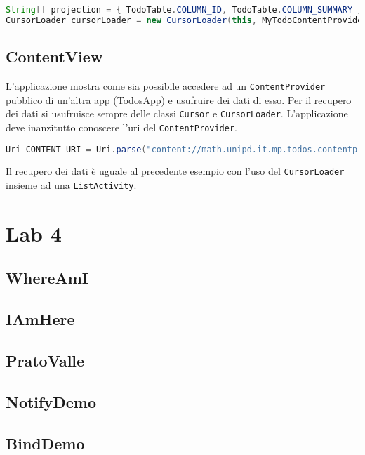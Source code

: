 \begin{lstlisting}[language=Java]
String[] projection = { TodoTable.COLUMN_ID, TodoTable.COLUMN_SUMMARY };
CursorLoader cursorLoader = new CursorLoader(this, MyTodoContentProvider.CONTENT_URI, projection, null, null, null);
\end{lstlisting}


\subsection{ContentView}

L'applicazione mostra come sia possibile accedere ad un
\lstinline|ContentProvider| pubblico di un'altra app (TodosApp) e usufruire dei
dati di esso. Per il recupero dei dati si usufruisce sempre delle classi
\lstinline|Cursor| e \lstinline|CursorLoader|.
L'applicazione deve inanzitutto conoscere l'uri del \lstinline|ContentProvider|.
\begin{lstlisting}[language=Java]
Uri CONTENT_URI = Uri.parse("content://math.unipd.it.mp.todos.contentprovider/todos");
\end{lstlisting}
Il recupero dei dati è uguale al precedente esempio con l'uso del
\lstinline|CursorLoader| insieme ad una \lstinline|ListActivity|.

\section{Lab 4}

\subsection{WhereAmI}

\subsection{IAmHere}

\subsection{PratoValle}

\subsection{NotifyDemo}

\subsection{BindDemo}



\undef{\Activity}
\undef{\Intent}
\undef{\View}
\undef{\ViewGroup}
\undef{\LinearLayout}
\undef{\RelativeLayout}
\undef{\ScrollView}
\undef{\ListView}
\undef{\SharedPreferences}
\undef{\ListFragment}
\undef{\MainActivity}
\undef{\AsyncTask}
\undef{\FrameLayout}
\undef{\WorkoutListFragment}
\undef{\Fragment}
\undef{\SQLiteDatabase}
\undef{\SQLiteOpenHelper}
\undef{\Cursor}